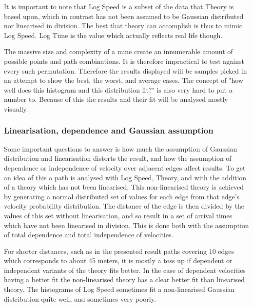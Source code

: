\documentclass{article}
\begin{document}
			It is important to note that Log Speed is a subset of the data that Theory is based upon, which in contrast has not been assumed to be Gaussian distributed nor linearised in division. The best that theory can accomplish is thus to mimic Log Speed. Log Time is the value which actually reflects real life though.

			The massive size and complexity of a mine create an innumerable amount of possible points and path combinations. It is therefore impractical to test against every such permutation. Therefore the results displayed will be samples picked in an attempt to show the best, the worst, and average cases. The concept of "how well does this histogram and this distribution fit?" is also very hard to put a number to. Because of this the results and their fit will be analysed mostly visually.

			\subsubsection{Linearisation, dependence and Gaussian assumption}
			\label{sec:dependenceResults}
				Some important questions to answer is how much the assumption of Gaussian distribution and linearisation distorts the result, and how the assumption of dependence or independence of velocity over adjacent edges affect results. To get an idea of this a path is analysed with Log Speed, Theory, and with the addition of a theory which has not been linearised. This non-linearised theory is achieved by generating a normal distributed set of values for each edge from that edge's velocity probability distribution. The distance of the edge is then divided by the values of this set without linearisation, and so result in a set of arrival times which have not been linearised in division. This is done both with the assumption of total dependence and total independence of velocities.

				For shorter distances, such as in the presented result paths covering 10 edges which corresponds to about 45 meters, it is mostly a toss up if dependent or independent variants of the theory fits better. In the case of dependent velocities having a better fit the non-linearised theory has a clear better fit than linearised theory. The histograms of Log Speed sometimes fit a non-linearised Gaussian distribution quite well, and sometimes very poorly.
\end{document}
